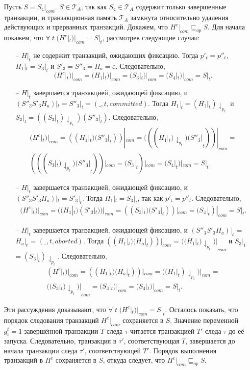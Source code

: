 \begin{myproof}
Пусть $S = S_4|_{com}$. $S \in \mathcal{T}_A$, так как $S_4 \in \mathcal{T}_A$ содержит только завершенные транзакции, и транзакционная память $\mathcal{T}_A$ замкнута относительно удаления действующих и прерванных транзакций. Докажем, что $H^c|_{com} \sqsubseteq_{op} S$. Для начала покажем, что $\forall \; t \; (H^c|_t)|_{com} = S|_t$, рассмотрев следующие случаи:
\begin{itemize}
\item[--] $H|_t$ не содержит транзакций, ожидающих фиксацию. Тогда $p'_t = p''_t$, $H_1|_t = S_3|_t$ и $S'_3 = S''_3 = H_a = \varepsilon$. Следовательно, $$(H^c|_t)|_{com} = (H_1|_t)|_{com} = (S_3|_t)|_{com} = (S_4|_t)|_{com} = S|_t.$$
\item[--] $H|_t$ завершается транзакцией, ожидающей фиксацию, и $(S''_3S'_3H_a)|_t = S''_3|_t = (\_,t,committed)$. Тогда $H_1|_t = (H_1|_t)\downharpoonleft_{p_t}$ и $S_3|_t = ((S_3|_t)\downharpoonleft_{p_t})(S''_3|_t)$. Следовательно, 
\begin{align*}
(H^c|_t)|_{com} = ((H_1|_t)(S''_3|_t))|_{com} = (((H_1|_t)\downharpoonleft_{p_t})(S''_3|_t))|_{com} = \\
(((S_3|_t)\downharpoonleft_{p_t})(S''_3|_t))|_{com} = (S_3|_t)|_{com} = (S_4|_t)|_{com} = S|_t.
\end{align*}
\item[--] $H|_t$ завершается транзакцией, ожидающей фиксацию, и $(S''_3S'_3H_a)|_t = S'_3|_t$. Тогда $H_1|_t = S_3|_t$, так как $p'_t = p''_t$. Следовательно, 
\begin{align*}
(H^c|_t)|_{com} = ((H_1|_t)(S'_3|_t))|_{com} = ((S_3|_t)(S'_3|_t))|_{com} = (S_4|_t)|_{com} = S|_t.
\end{align*}
\item[--] $H|_t$ завершается транзакцией, ожидающей фиксацию, и $(S''_3S'_3H_a)|_t$ = $H_a|_t$ = $(\_, t, aborted)$. Тогда $((H_1|_t)(H_a|_t))|_{com}$ = $((H_1|_t)\downharpoonleft_{p_t})|_{com}$ и $S_3|_t$ = $(S_3|_t)\downharpoonleft_{p_t}$. Следовательно,
\begin{align*}
(H^c|_t)|_{com} = ((H_1|_t)(H_a|_t))|_{com} = ((H_1|_t)\downharpoonleft_{p_t})|_{com} =\\
((S_3|_t)\downharpoonleft_{p_t})|_{com} = (S_3|_t)|_{com} = (S_4|_t)|_{com} = S|_t. 
\end{align*}
\end{itemize}

Эти рассуждения доказывают, что $\forall \; t \; (H^c|_t)|_{com} = S|_t$. Осталось показать, что порядок следования транзакций $H^c|_{com}$ сохраняется в $S$. Значение переменной $g^t_i = 1$ завершённой транзакции $T$ следа $\tau$ читается транзакцией $T'$ следа $\tau$ до её запуска. Следовательно, транзакция в $\tau'$, соответствующая $T$, завершается до начала транзакции следа $\tau'$, соответствующей $T'$. Порядок выполнения транзакций в $H^c$ сохраняется в $S$, откуда следует, что $H^c|_{com} \sqsubseteq_{op} S$. 
\end{myproof}
